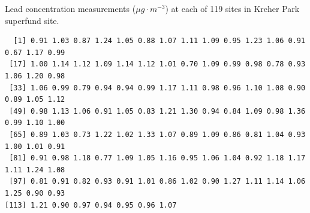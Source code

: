 \documentclass[10pt,openany]{book}\usepackage[]{graphicx}\usepackage[]{color}
\makeatletter
\newenvironment{kframe}{%
 \def\at@end@of@kframe{}%
 \ifinner\ifhmode%
  \def\at@end@of@kframe{\end{minipage}}%
  \begin{minipage}{\columnwidth}%
 \fi\fi%
 \def\FrameCommand##1{\hskip\@totalleftmargin \hskip-\fboxsep
 \colorbox{shadecolor}{##1}\hskip-\fboxsep
     \hskip-\linewidth \hskip-\@totalleftmargin \hskip\columnwidth}%
 \MakeFramed {\advance\hsize-\width
   \@totalleftmargin\z@ \linewidth\hsize
   \@setminipage}}%
 {\par\unskip\endMakeFramed%
 \at@end@of@kframe}
\newenvironment{knitrout}{}{} %
\makeatother
\begin{document}
\begin{table}[htbp]   \label{tab:KreherParkPbconc}
  \caption{Lead concentration measurements ($\mu g \cdot m^{-3}$) at each of 119 sites in Kreher Park superfund site.}
  \begin{center}
\begin{knitrout}
\color{fgcolor}\begin{kframe}
\begin{verbatim}
  [1] 0.91 1.03 0.87 1.24 1.05 0.88 1.07 1.11 1.09 0.95 1.23 1.06 0.91 0.67 1.17 0.99
 [17] 1.00 1.14 1.12 1.09 1.14 1.12 1.01 0.70 1.09 0.99 0.98 0.78 0.93 1.06 1.20 0.98
 [33] 1.06 0.99 0.79 0.94 0.94 0.99 1.17 1.11 0.98 0.96 1.10 1.08 0.90 0.89 1.05 1.12
 [49] 0.98 1.13 1.06 0.91 1.05 0.83 1.21 1.30 0.94 0.84 1.09 0.98 1.36 0.99 1.10 1.00
 [65] 0.89 1.03 0.73 1.22 1.02 1.33 1.07 0.89 1.09 0.86 0.81 1.04 0.93 1.00 1.01 0.91
 [81] 0.91 0.98 1.18 0.77 1.09 1.05 1.16 0.95 1.06 1.04 0.92 1.18 1.17 1.11 1.24 1.08
 [97] 0.81 0.91 0.82 0.93 0.91 1.01 0.86 1.02 0.90 1.27 1.11 1.14 1.06 1.25 0.90 0.93
[113] 1.21 0.90 0.97 0.94 0.95 0.96 1.07
\end{verbatim}
\end{kframe}
\end{knitrout}
  \end{center}
\end{table}
\end{document}
